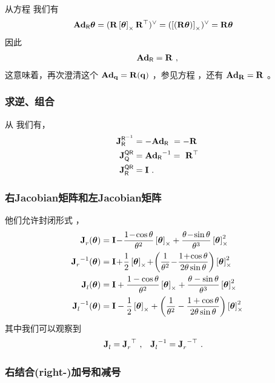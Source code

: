 从方程  我们有
%
\begin{align*}
\Ad{\sR} \bth
&= (\bfR\hatx{\bth}\bfR\tr)^\vee 
= (\hatx{(\bfR\bth)})^\vee 
= \bfR\bth
\end{align*}
%
因此
%
\begin{align}
\Ad{\sR} = \bfR~,
\end{align}
%
这意味着，再次澄清这个 $\Ad[S^3]{\bfq}=\bfR(\bfq)$ ，参见方程  ，还有 $\Ad[\SO(3)]{\bfR}=\bfR$ 。

\subsubsection{求逆、组合}
\label{sec:SO3_inv_comp}

从  我们有，
%
\begin{align}
\mjac{\sR\inv}{\sR} &= -\Ad{\sR} ~= -\bfR \\
\mjac{\sQ\sR}{\sQ} &= \Ad{\sR}\inv = ~\bfR\tr \\
\mjac{\sQ\sR}{\sR} &= \bfI ~.
\end{align}


\subsubsection{右Jacobian矩阵和左Jacobian矩阵}

他们允许封闭形式 \cite[pag.~40]{CHIRIKJIAN-11}， 
%
\begin{align}
\mjac{}{r}(\bth) &= \bfI \!-\! \frac{1\!-\!\cos\theta}{\theta^2}\hatx{\bth} + \frac{\theta\!-\!\sin\theta}{\theta^3}\hatx{\bth}^2\\
\mjac{}{r}\inv(\bth) &= \bfI \!+\! \frac12\hatx{\bth} \!+\! \left(\frac{1}{\theta^2} \!-\! \frac{1\!+\!\cos\theta}{2\theta\sin\theta}\right)\hatx{\bth}^2 \\
\mjac{}{l}(\bth) &= \bfI + \frac{1-\cos\theta}{\theta^2}\hatx{\bth} + \frac{\theta-\sin\theta}{\theta^3}\hatx{\bth}^2 \label{equ:SO3_Jl} \\
\mjac{}{l}\inv(\bth) &= \bfI - \frac12\hatx{\bth} + \left(\frac1{\theta^2} - \frac{1+\cos\theta}{2\theta\sin\theta}\right)\hatx{\bth}^2 \label{equ:SO3_Jl_inv}
\end{align}
%
其中我们可以观察到
%
\begin{align}
\mjac{}{l} &= \mjac{}{r}\tr 
~,
&
\mjac{}{l}\inv &= \mjac{}{r}^{-\top}
~.
\end{align}

\subsubsection{右结合(right-)加号和减号}

